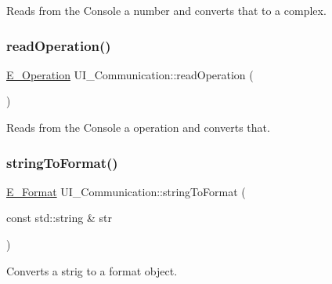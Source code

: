 Reads from the Console a number and converts that to a complex. 

\mbox{\label{class_u_i___communication_a53c5898becc61bc725b6c3a648719b42}} 
\subsubsection{\texorpdfstring{read\+Operation()}{readOperation()}}
{\footnotesize\ttfamily \mbox{\hyperlink{_calculation_8h_a57e7c508a7a8b39e59743eb5a00b2ef7}{E\+\_\+\+Operation}} U\+I\+\_\+\+Communication\+::read\+Operation (\begin{DoxyParamCaption}{ }\end{DoxyParamCaption})}



Reads from the Console a operation and converts that. 

\mbox{\label{class_u_i___communication_aa3cc2f29ba1415624631e515de310523}} 
\subsubsection{\texorpdfstring{string\+To\+Format()}{stringToFormat()}}
{\footnotesize\ttfamily \mbox{\hyperlink{_complex_8h_adaa0992033b28ba1421a05c029ffa82e}{E\+\_\+\+Format}} U\+I\+\_\+\+Communication\+::string\+To\+Format (\begin{DoxyParamCaption}\item[{const std\+::string \&}]{str }\end{DoxyParamCaption})}



Converts a strig to a format object. 

\mbox{\label{class_u_i___communication_ac0196e2d6866f1dc548940abfa4f53a2}} 
